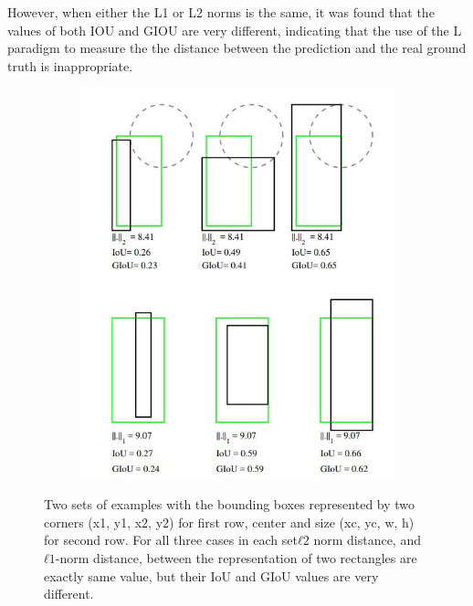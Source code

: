 However, when either the L1 or L2 norms is the same, it was found that the values of both IOU and GIOU are very different, indicating that the use of the L paradigm to measure the the distance between  the prediction and the real ground truth is inappropriate.



\begin{figure}[h]
	\begin{center}
		\begin{subfigure}[b]{0.49\textwidth}
		    \centering
			\includegraphics[width=\textwidth]{thesis-template-master/images/l2loss.JPG}
			\label{fig:cellnet}
		\end{subfigure}
	\end{center}
	\caption{Two sets of examples with the bounding
boxes represented by two corners (x1, y1, x2, y2) for first row, center and size (xc, yc, w, h) for second row. For all three cases in each set$ ℓ2$
norm distance, and  $ℓ1$-norm distance, between the representation of two rectangles are exactly same value, but their IoU and GIoU values are very different.}
\end{figure}


